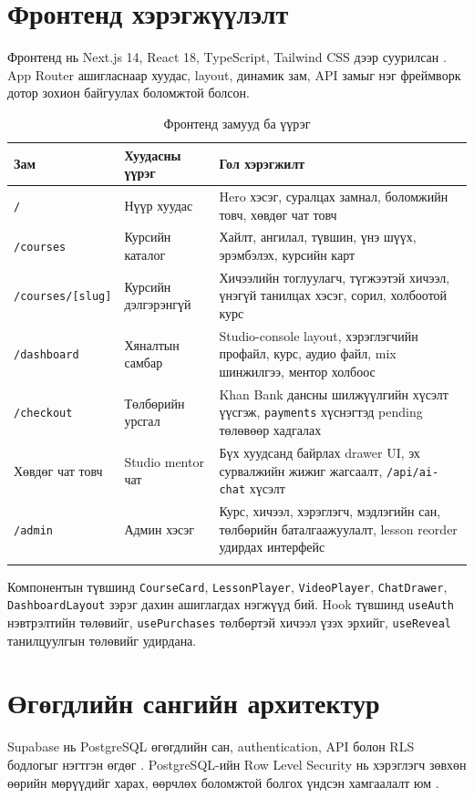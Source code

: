 \section{Фронтенд хэрэгжүүлэлт}
Фронтенд нь Next.js 14, React 18, TypeScript, Tailwind CSS дээр суурилсан \cite{nextjs_docs,react_learn,typescript_handbook,tailwind_docs}. App Router ашигласнаар хуудас, layout, динамик зам, API замыг нэг фреймворк дотор зохион байгуулах боломжтой болсон.

\begin{longtable}{|p{}|p{}|p{}|}
  \hline
  \textbf{Зам} & \textbf{Хуудасны үүрэг} & \textbf{Гол хэрэгжилт} \\ \hline
  \texttt{/} & Нүүр хуудас & Hero хэсэг, суралцах замнал, боломжийн товч, хөвдөг чат товч \\ \hline
  \texttt{/courses} & Курсийн каталог & Хайлт, ангилал, түвшин, үнэ шүүх, эрэмбэлэх, курсийн карт \\ \hline
  \texttt{/courses/[slug]} & Курсийн дэлгэрэнгүй & Хичээлийн тоглуулагч, түгжээтэй хичээл, үнэгүй танилцах хэсэг, сорил, холбоотой курс \\ \hline
  \texttt{/dashboard} & Хяналтын самбар & Studio-console layout, хэрэглэгчийн профайл, курс, аудио файл, mix шинжилгээ, ментор холбоос \\ \hline
  \texttt{/checkout} & Төлбөрийн урсгал & Khan Bank дансны шилжүүлгийн хүсэлт үүсгэж, \texttt{payments} хүснэгтэд pending төлөвөөр хадгалах \\ \hline
  Хөвдөг чат товч & Studio mentor чат & Бүх хуудсанд байрлах drawer UI, эх сурвалжийн жижиг жагсаалт, \texttt{/api/ai-chat} хүсэлт \\ \hline
  \texttt{/admin} & Админ хэсэг & Курс, хичээл, хэрэглэгч, мэдлэгийн сан, төлбөрийн баталгаажуулалт, lesson reorder удирдах интерфейс \\ \hline
  \caption{Фронтенд замууд ба үүрэг}
  \label{tab:ch3-routes}
\end{longtable}

Компонентын түвшинд \texttt{CourseCard}, \texttt{LessonPlayer}, \texttt{VideoPlayer}, \texttt{ChatDrawer}, \texttt{DashboardLayout} зэрэг дахин ашиглагдах нэгжүүд бий. Hook түвшинд \texttt{useAuth} нэвтрэлтийн төлөвийг, \texttt{usePurchases} төлбөртэй хичээл үзэх эрхийг, \texttt{useReveal} танилцуулгын төлөвийг удирдана.

\section{Өгөгдлийн сангийн архитектур}
Supabase нь PostgreSQL өгөгдлийн сан, authentication, API болон RLS бодлогыг нэгтгэн өгдөг \cite{supabase_docs,supabase_rls}. PostgreSQL-ийн Row Level Security нь хэрэглэгч зөвхөн өөрийн мөрүүдийг харах, өөрчлөх боломжтой болгох үндсэн хамгаалалт юм \cite{postgres_rls}.

